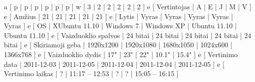 \xtableu
{
  a [ p | p | p | p | p | p ]
  w [ 3 | 2 | 2 | 2 | 2 | 2 ]
  e [ Vertintojas         | A | E | J | M | V ]
  e [ Amžius              | 21 | 21 | 21 | 21 | 21 ]
  e [ Lytis               | Vyras | Vyras | Vyras | Vyras | Vyras ]
  e [ OS                  | XUbuntu 11.10 | Windows 7 | Windows XP | Ubuntu 11.10 | Ubuntu 11.10 ]
  e [ Vaizduoklio spalvos | 24 bitai | 24 bitai | 24 bitai | 24 bitai | 24 bitai ]
  e [ Skiriamoji geba     | 1920x1200 | 1920x1080 | 1680x1050 | 1024x600 | 1366x768 ]
  e [ Vaizduoklio dydis   | 17" | 23" | 22" | 10.1" | 15.4" ]
  e [ Vertinimo data      | 2011-12-03 | 2011-12-05 | 2011-12-04 | 2011-12-04  | 2011-12-05 ]
  e [ Vertinimo laikas    | ? | 11:17 – 12:53 | ? | ? | 15:05 – 16:15 ]
}
